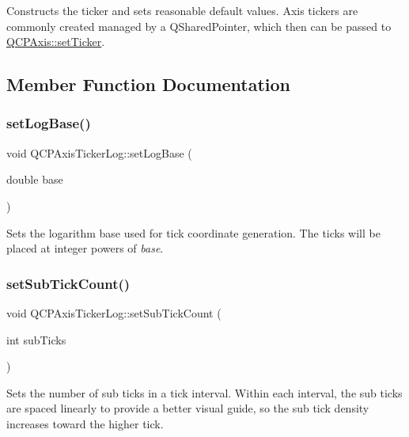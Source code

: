 Constructs the ticker and sets reasonable default values. Axis tickers are commonly created managed by a Q\+Shared\+Pointer, which then can be passed to \mbox{\hyperlink{class_q_c_p_axis_a4ee03fcd2c74d05cd1a419b9af5cfbdc}{Q\+C\+P\+Axis\+::set\+Ticker}}. 

\subsection{Member Function Documentation}
\mbox{\label{class_q_c_p_axis_ticker_log_ac6e3b4e03baea3816f898869ab9751ef}} 
\subsubsection{\texorpdfstring{set\+Log\+Base()}{setLogBase()}}
{\footnotesize\ttfamily void Q\+C\+P\+Axis\+Ticker\+Log\+::set\+Log\+Base (\begin{DoxyParamCaption}\item[{double}]{base }\end{DoxyParamCaption})}

Sets the logarithm base used for tick coordinate generation. The ticks will be placed at integer powers of {\itshape base}. \mbox{\label{class_q_c_p_axis_ticker_log_ad51989c798c0cfd50936d77aac57c56a}} 
\subsubsection{\texorpdfstring{set\+Sub\+Tick\+Count()}{setSubTickCount()}}
{\footnotesize\ttfamily void Q\+C\+P\+Axis\+Ticker\+Log\+::set\+Sub\+Tick\+Count (\begin{DoxyParamCaption}\item[{int}]{sub\+Ticks }\end{DoxyParamCaption})}

Sets the number of sub ticks in a tick interval. Within each interval, the sub ticks are spaced linearly to provide a better visual guide, so the sub tick density increases toward the higher tick.

